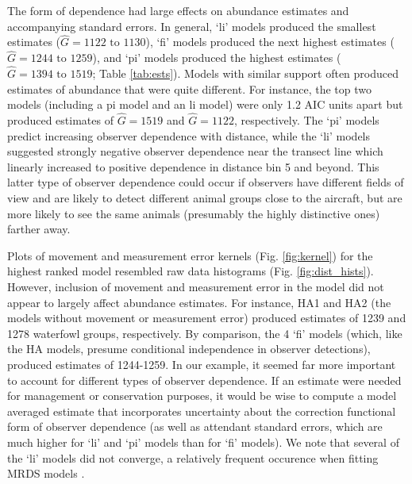 \documentclass[12pt,fleqn]{article}
\begin{document}
The form of dependence had large effects on abundance estimates and accompanying standard errors. In general, `li' models produced the smallest estimates ($\hat{G}= 1122 \text{ to } 1130$), `fi' models produced the next highest estimates ($\hat{G}= 1244 \text{ to } 1259$), and `pi' models produced the highest estimates ($\hat{G}= 1394 \text{ to } 1519$; Table \ref{tab:ests}).  Models with similar support often produced estimates of abundance that were quite different.  For instance, the top two models (including a pi model and an li model) were only 1.2 AIC units apart but produced estimates of $\hat{G}=1519$ and $\hat{G}=1122$, respectively.  The `pi' models predict increasing observer dependence with distance, while the `li' models suggested strongly negative observer dependence near the transect line which linearly increased to positive dependence in distance bin 5 and beyond.  This latter type of observer dependence could occur if observers have different fields of view and are likely to detect different animal groups close to the aircraft, but are more likely to see the same animals (presumably the highly distinctive ones) farther away.

Plots of movement and measurement error kernels (Fig. \ref{fig:kernel}) for the highest ranked model resembled raw data histograms (Fig. \ref{fig:dist_hists}).  However, inclusion of movement and measurement error in the model did not appear to largely affect abundance estimates.  For instance, HA1 and HA2 (the models without movement or measurement error) produced estimates of 1239 and 1278 waterfowl groups, respectively.  By comparison, the 4 `fi' models (which, like the HA models, presume conditional independence in observer detections), produced estimates of 1244-1259.   In our example, it seemed far more important to account for different types of observer dependence.  If an estimate were needed for management or conservation purposes, it would be wise to compute a model averaged estimate that incorporates uncertainty about the correction functional form of observer dependence (as well as attendant standard errors, which are much higher for `li' and `pi' models than for `fi' models).  We note that several of the `li' models did not converge, a relatively frequent occurence when fitting MRDS models \cite{BucklandEtAl2010,MacKenzieClement2016}.
\end{document}
